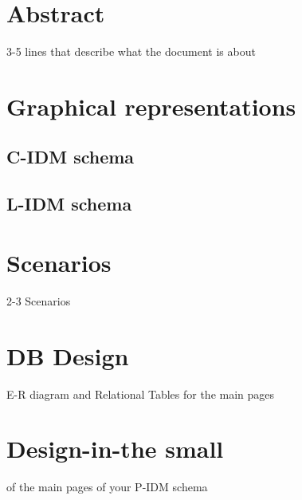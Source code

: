 \documentclass[a4paper, hidelinks, 12pt]{report}
\begin{document}
	\chapter{Abstract}
	
	3-5 lines that describe what the document is about
	
	\lipsum[1-4]
	
	\chapter{Graphical representations}
	
	\section{C-IDM schema}
	
	\section{L-IDM schema}
	
	\chapter{Scenarios}
	2-3 Scenarios
	
	\chapter{DB Design}
	E-R diagram and Relational Tables for the main pages
	
	\chapter{Design-in-the small}
	of the main pages of your P-IDM schema
			
	
\end{document}
